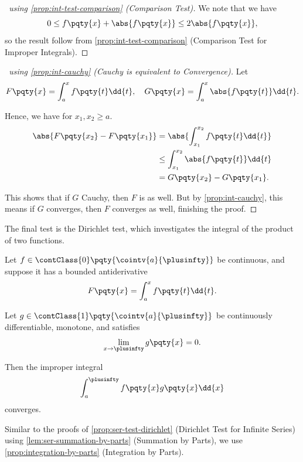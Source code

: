 \begin{proof}[\proofname\ using \autoref{prop:int-test-comparison} (Comparison Test)]
    We note that we have
    \[
        0 \leq f\pqty{x} + \abs{f\pqty{x}} \leq 2 \abs{f\pqty{x}},
    \]
    so the result follow from \autoref{prop:int-test-comparison} (Comparison Test for Improper Integrals).
\end{proof}

\begin{proof}[\proofname\ using \autoref{prop:int-cauchy} (Cauchy is equivalent to Convergence)]
    Let
    \[
        F\pqty{x} = \int_{a}^{x} f\pqty{t} \dd{t}, \quad G\pqty{x} = \int_{a}^{x} \abs{f\pqty{t}} \dd{t}.
    \]

    Hence, we have for \(x_1, x_2 \geq a\).
    \begin{align*}
        \abs{F\pqty{x_2} - F\pqty{x_1}} &= \abs{\int_{x_1}^{x_2} f\pqty{t} \dd{t}} \\
        &\leq \int_{x_1}^{x_2} \abs{f\pqty{t}} \dd{t} \\
        &= G\pqty{x_2} - G\pqty{x_1}.
    \end{align*}

    This shows that if \(G\) Cauchy, then \(F\) is as well. But by \autoref{prop:int-cauchy}, this means if \(G\) converges, then \(F\) converges as well, finishing the proof.
\end{proof}

The final test is the Dirichlet test, which investigates the integral of the product of two functions.

\begin{proposition}
    \label{prop:int-test-dirichlet}%
    Let \(f \in \contClass{0} \pqty{\cointv{a}{\plusinfty}}\) be continuous, and suppose it has a bounded antiderivative
    \[
        F\pqty{x} = \int_{a}^{x} f\pqty{t} \dd{t}.
    \]

    Let \(g \in \contClass{1} \pqty{\cointv{a}{\plusinfty}}\) be continuously differentiable, monotone, and satisfies
    \[
        \lim_{x \to \plusinfty} g\pqty{x} = 0.
    \]

    Then the improper integral
    \[
        \int_{a}^{\plusinfty} f\pqty{x} g\pqty{x} \dd{x}
    \]
    converges.
\end{proposition}

Similar to the proofs of \autoref{prop:ser-test-dirichlet} (Dirichlet Test for Infinite Series) using \autoref{lem:ser-summation-by-parts} (Summation by Parts), we use \autoref{prop:integration-by-parts} (Integration by Parts).

